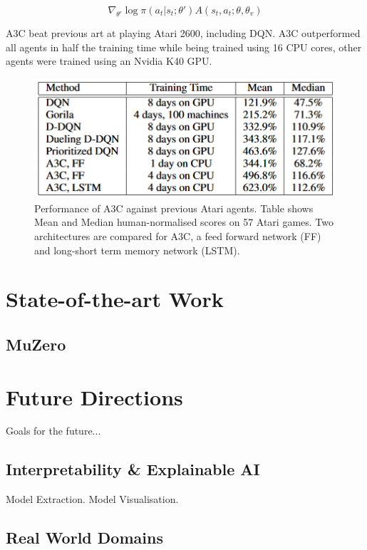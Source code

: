\documentclass[10pt,journal,compsoc]{IEEEtran}
\begin{document}
\begin{equation}
\label{policy_gradient}
\nabla_{\theta'} \log  \pi(a_t|s_t;\theta ')A(s_t,a_t;\theta,\theta_v)
\end{equation}

A3C beat previous art at playing Atari 2600, including DQN. A3C outperformed all agents in half the training time while being trained using 16 CPU cores, other agents were trained using an Nvidia K40 GPU.

\begin{figure}[!h]
\centering
\includegraphics[width=\linewidth]{a3c_atari_comparison}
\caption{Performance of A3C against previous Atari agents. Table shows Mean and Median human-normalised scores on 57 Atari games. Two architectures are compared for A3C, a feed forward network (FF) and long-short term memory network (LSTM).}
\label{dqn_learning}
\end{figure}


\section{State-of-the-art Work}
\subsection{MuZero}

\section{Future Directions}
Goals for the future...
\subsection{Interpretability \& Explainable AI}
Model Extraction.
Model Visualisation.
\subsection{Real World Domains}
\end{document}

